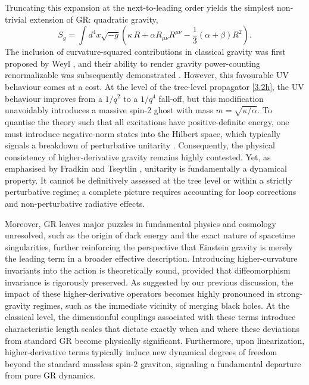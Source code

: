Truncating this expansion at the next-to-leading order yields the simplest non-trivial extension of GR: quadratic gravity,
\begin{equation}
     S_{g}=\int d^4 x \sqrt{-g}\left(\kappa \,{R}+\alpha {R}_{\mu\nu}{R}^{\mu\nu}-\frac{1}{3}(\alpha+\beta){R}^2\right).
\end{equation}
The inclusion of curvature-squared contributions in classical gravity was first proposed by Weyl \cite{weyl}, and their ability to render gravity power-counting renormalizable was subsequently demonstrated \cite{1962JMP.....3..608U, PhysRevD.16.953}. However, this favourable UV behaviour comes at a cost. At the level of the tree-level propagator \eqref{3.2h}, the UV behaviour improves from a $1/q^2$ to a $1/q^4$ fall-off, but this modification unavoidably introduces a massive spin-2 ghost with mass $m = \sqrt{\kappa/\alpha}$. To quantise the theory such that all excitations have positive-definite energy, one must introduce negative-norm states into the Hilbert space, which typically signals a breakdown of perturbative unitarity \cite{PhysRev.79.145}. Consequently, the physical consistency of higher-derivative gravity remains highly contested. Yet, as emphasised by  Fradkin and  Tseytlin \cite{FRADKIN1982469}, unitarity is fundamentally a dynamical property. It cannot be definitively assessed at the tree level or within a strictly perturbative regime; a complete picture requires accounting for loop corrections and non-perturbative radiative effects. 


Moreover, GR leaves major puzzles in fundamental physics and cosmology unresolved, such as the origin of dark energy and the exact nature of spacetime singularities, further reinforcing the perspective that Einstein gravity is merely the leading term in a broader effective description. Introducing higher-curvature invariants into the action is theoretically sound, provided that diffeomorphism invariance is rigorously preserved. As suggested by our previous discussion, the impact of these higher-derivative operators becomes highly pronounced in strong-gravity regimes, such as the immediate vicinity of merging black holes. At the classical level, the dimensionful couplings associated with these terms introduce characteristic length scales that dictate exactly when and where these deviations from standard GR become physically significant. Furthermore, upon linearization, higher-derivative terms typically induce new dynamical degrees of freedom beyond the standard massless spin-2 graviton, signaling a fundamental departure from pure GR dynamics. 

